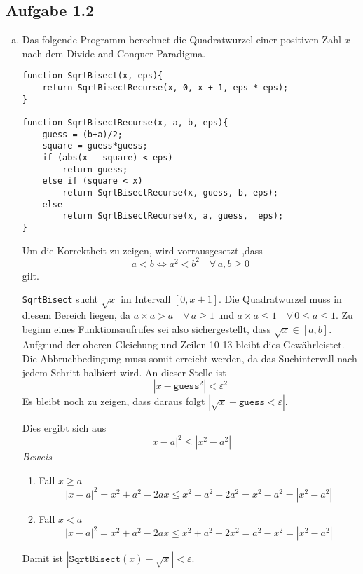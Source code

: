 \documentclass[11pt]{article}
\newcommand{\abs}[1]{\left| #1 \right| }
\begin{document}
\subsection*{Aufgabe 1.2}
\begin{enumerate}[a)]
  \item
    Das folgende Programm berechnet die Quadratwurzel einer positiven
    Zahl $x$ nach dem Divide-and-Conquer Paradigma.


    \begin{lstlisting}
function SqrtBisect(x, eps){
    return SqrtBisectRecurse(x, 0, x + 1, eps * eps);
}

function SqrtBisectRecurse(x, a, b, eps){
    guess = (b+a)/2;
    square = guess*guess;
    if (abs(x - square) < eps)
        return guess;
    else if (square < x)
        return SqrtBisectRecurse(x, guess, b, eps);
    else
        return SqrtBisectRecurse(x, a, guess,  eps);
}
  \end{lstlisting}

  Um die Korrektheit zu zeigen, wird vorrausgesetzt ,dass
  \begin{equation}
    a < b \iff a^2 < b^2 \quad\forall\, a, b \ge 0
  \end{equation}
  gilt.

  \texttt{SqrtBisect} sucht $\sqrt{x}$ im Intervall $[0,x+1]$. Die Quadratwurzel
  muss in diesem Bereich liegen, da $a \times a > a \quad\forall\, a \ge 1 $ und
  $a \times a \le 1 \quad\forall\, 0 \le a \le 1$.
  Zu beginn eines Funktionsaufrufes sei also sichergestellt, dass $\sqrt{x} \in
  [a,b]$.  Aufgrund der oberen Gleichung und Zeilen 10-13 bleibt dies
  Gew\"ahrleistet. Die Abbruchbedingung muss somit erreicht werden, da das
  Suchintervall nach jedem Schritt halbiert wird. An dieser Stelle ist
  \begin{equation}
  | x - \texttt{guess}^2 | < \varepsilon^2
  \end{equation}
  Es bleibt noch zu zeigen, dass daraus folgt $\left| \sqrt{x} - \texttt{guess}
  < \varepsilon \right|$.

  Dies ergibt sich aus \[ \left| x-a \right|^2 \le \left| x^2 - a^2 \right|  \]
  \emph{Beweis}
  \begin{enumerate}
    \item Fall $x \ge a$
      \[ \abs{x-a}^2 = x^2 + a^2 - 2 ax \le x^2 + a^2 - 2 a^2 = x^2 -a^2 =
      \abs{x^2-a^2}  \]
    \item Fall $x < a$
      \[ \abs{x-a}^2 = x^2 + a^2 - 2 ax \le x^2 + a^2 - 2 x^2 = a^2 -x^2 =
      \abs{x^2-a^2}  \]
  \end{enumerate}
  Damit ist $\abs{ \texttt{SqrtBisect}(x)- \sqrt{x} } < \varepsilon$.


\end{enumerate}
\end{document}
